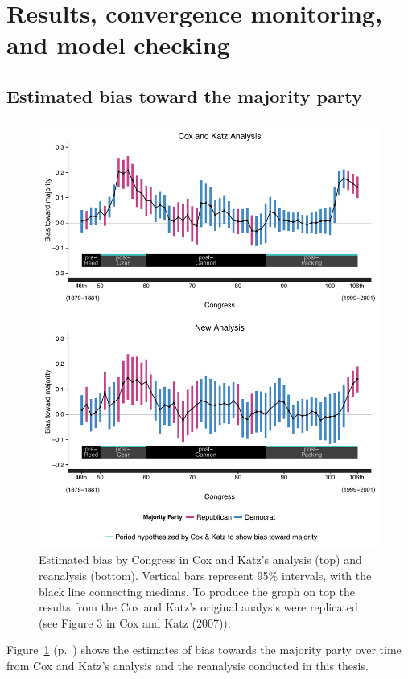 \section{Results, convergence monitoring, and model checking}


\subsection{Estimated bias toward the majority party}
\label{results}

\begin{figure}
\centering
\includegraphics[scale=0.75]{sections/figs/ck_replication}
\caption{Estimated bias by Congress in Cox and Katz's analysis (top) and reanalysis (bottom). Vertical bars represent 95\%  intervals, with the black line connecting medians. To produce the graph on top the results from the Cox and Katz's original analysis were replicated (see Figure 3 in Cox and Katz (2007)).}
\label{fig:ck_bias}
\end{figure}

Figure~\ref{fig:ck_bias} (p.~\pageref{fig:ck_bias}) shows the estimates of bias towards the majority party over time from Cox and Katz's analysis and the reanalysis conducted in this thesis. 

